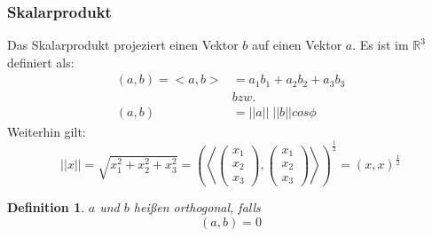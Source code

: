 \documentclass[12pt,a4paper]{report}%
\newtheorem{definition}[satz]{Definition}
\numberwithin{equation}{section}
\newcommand{\R}{\mathbb{R}} %
\def\vecT#1{\left(\begin{array}{c} #1 \end{array}\right)}
\numberwithin{equation}{subsection}
\begin{document}
  \subsubsection{Skalarprodukt}
  Das Skalarprodukt projeziert einen Vektor $b$ auf einen Vektor $a$. Es ist im $\R^3$ definiert als:
  \begin{align}
    (a,b) = <a,b> &= a_1 b_1 + a_2 b_2 + a_3 b_3 \\
    &bzw. \nonumber \\
    (a,b) &= ||a|| \; ||b|| cos \phi
  \end{align}
  Weiterhin gilt:
  \begin{equation}
  ||x|| = \sqrt{x_1^2 + x_2^2 + x_3^2} = \left(\left<\vecT{x_1 \\ x_2 \\ x_3},\vecT{x_1 \\ x_2 \\ x_3}\right>\right)^{\frac{1}{2}} = (x,x)^{\frac{1}{2}}
  \end{equation}
  \begin{definition}
	  $a$ und $b$ heißen orthogonal, falls 
	  \begin{equation*}
	    (a,b) = 0 
	  \end{equation*}
  \end{definition}
  
\end{document}
